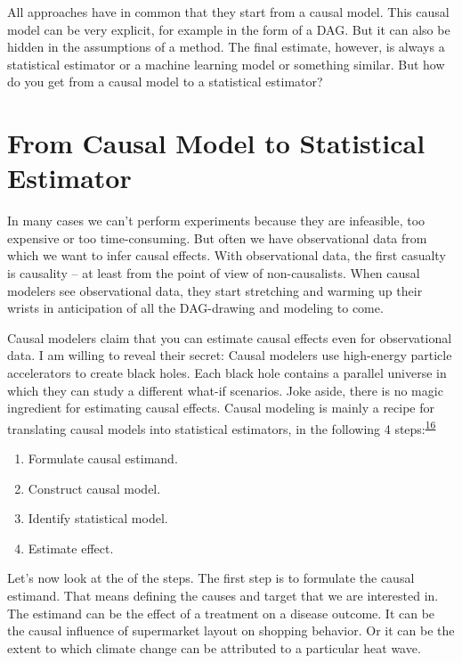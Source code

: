 \documentclass[
  10pt,
]{scrbook}
\providecommand{\tightlist}{%
  \setlength{\itemsep}{0pt}\setlength{\parskip}{0pt}}
\begin{document}
All approaches have in common that they start from a causal model.
This causal model can be very explicit, for example in the form of a DAG.
But it can also be hidden in the assumptions of a method.
The final estimate, however, is always a statistical estimator or a machine learning model or something similar.
But how do you get from a causal model to a statistical estimator?

\hypertarget{from-causal-model-to-statistical-estimator}{%
\section{From Causal Model to Statistical Estimator}\label{from-causal-model-to-statistical-estimator}}

In many cases we can't perform experiments because they are infeasible, too expensive or too time-consuming.
But often we have observational data from which we want to infer causal effects.
With observational data, the first casualty is causality -- at least from the point of view of non-causalists.
When causal modelers see observational data, they start stretching and warming up their wrists in anticipation of all the DAG-drawing and modeling to come.

Causal modelers claim that you can estimate causal effects even for observational data.
I am willing to reveal their secret:
Causal modelers use high-energy particle accelerators to create black holes.
Each black hole contains a parallel universe in which they can study a different what-if scenarios.
Joke aside, there is no magic ingredient for estimating causal effects.
Causal modeling is mainly a recipe for translating causal models into statistical estimators, in the following 4 steps:\textsuperscript{\protect\hyperlink{ref-pearl2009causal}{16}}

\begin{enumerate}
\def\labelenumi{\arabic{enumi}.}
\tightlist
\item
  Formulate causal estimand.
\item
  Construct causal model.
\item
  Identify statistical model.
\item
  Estimate effect.
\end{enumerate}

Let's now look at the of the steps.
The first step is to formulate the causal estimand.
That means defining the causes and target that we are interested in.
The estimand can be the effect of a treatment on a disease outcome.
It can be the causal influence of supermarket layout on shopping behavior.
Or it can be the extent to which climate change can be attributed to a particular heat wave.
\end{document}
